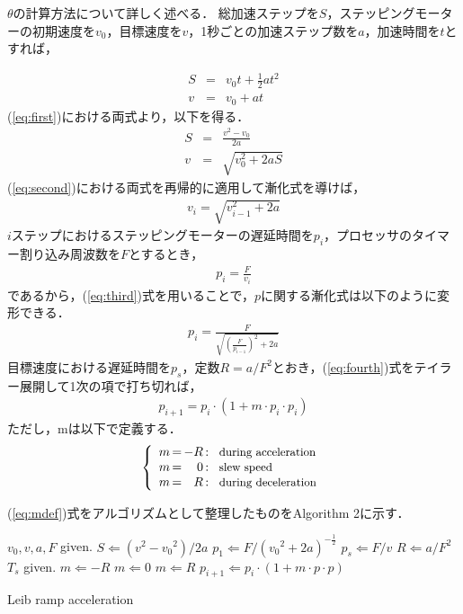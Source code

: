 \documentclass[twocolumn,oneside,a4paper]{article}
\begin{document}
$\theta$の計算方法について詳しく述べる．
総加速ステップを$S$，ステッピングモーターの初期速度を$v_0$，目標速度を$v$，1秒ごとの加速ステップ数を$a$，加速時間を$t$とすれば，

\begin{eqnarray}\label{eq:first}
     S &=& v_0 t + \frac{1}{2} a t^2 \nonumber \\
     v &=& v_0 + a t    
\end{eqnarray}
(\ref{eq:first})における両式より，以下を得る．
\begin{eqnarray}\label{eq:second}
     S &=& \frac{v^2-v_0}{2 a} \nonumber \\
     v &=& \sqrt{v_0^2+2aS}
\end{eqnarray}
(\ref{eq:second})における両式を再帰的に適用して漸化式を導けば，
\begin{eqnarray}\label{eq:third}
     v_i = \sqrt{v_{i-1}^2 + 2a}
\end{eqnarray}
$i$ステップにおけるステッピングモーターの遅延時間を$p_i$，プロセッサのタイマー割り込み周波数を$F$とするとき，
\begin{eqnarray*}
     p_i = \frac{F}{v_i}
\end{eqnarray*}
であるから，(\ref{eq:third})式を用いることで，$p$に関する漸化式は以下のように変形できる．
\begin{eqnarray}\label{eq:fourth}
     p_i = \frac{F}{\sqrt{{(\frac{F}{p_{i-1}})}^2+2a}}
\end{eqnarray}
目標速度における遅延時間を$p_s$，定数$R= a/F^2$とおき，(\ref{eq:fourth})式をテイラー展開して1次の項で打ち切れば，
\begin{eqnarray}\label{eq:pupdate}
     p_{i+1} = p_i \cdot (1 + m \cdot p_i \cdot p_i)
\end{eqnarray}
ただし，mは以下で定義する．
\begin{eqnarray}\label{eq:mdef}
\left\{
\begin{array}{r@{\,}c@{\,}r@{\,}c@{\,}l@{\;\;}r}
 m &=& -R &:& \:\:\: \mbox{\small during acceleration}\\
 m &=& 0 &:&  \:\:\: \mbox{\small slew speed}\\
 m &=& R &:&  \:\:\: \mbox{\small during deceleration}
\end{array}%
\right.
\end{eqnarray}

(\ref{eq:mdef})式をアルゴリズムとして整理したものをAlgorithm 2に示す．

\begin{algorithm}[h]        
\begin{algorithmic}                 
\STATE $v_0, v, a, F$ given.
\STATE $S \Leftarrow (v^2-{v_0}^2) / 2 a$
\STATE $p_1 \Leftarrow F / ({v_0}^2 + 2a)^{-\frac{1}{2}}$
\STATE $p_s \Leftarrow F/v$
\STATE $R \Leftarrow a / F^2$
\STATE $T_s$ given.
  \STATE $m \Leftarrow -R$
  \STATE $m \Leftarrow 0$
\ELSE
  \STATE $m \Leftarrow R$
\ENDIF
\STATE $p_{i+1} \Leftarrow p_i \cdot (1+m\cdot p \cdot p)$
\ENDFOR
\end{algorithmic}
\caption{Leib ramp acceleration}
\label{fig:leib_algorithm}                         
\end{algorithm}
\end{document}
